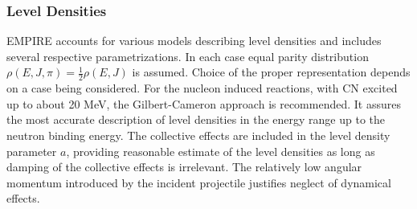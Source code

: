 \documentclass[twocolumn,amsmath,amssymb,10pt,groupedaddress,letter]{revtex4}
\begin{document}
%
%
%


\subsubsection{Level Densities}
EMPIRE accounts for various models describing level densities
and includes several respective parametrizations. In each case equal
parity distribution $\rho(E,J,\pi)=\frac{1}{2}\rho(E,J)$ is assumed.
Choice of the proper representation depends on a case being considered.
For the nucleon induced reactions, with CN excited up to about 20
MeV, the Gilbert-Cameron approach is recommended. It assures the most
accurate description of level densities in the energy range up to
the neutron binding energy. The collective effects are included in
the level density parameter $a$, providing reasonable estimate of
the level densities as long as damping of the collective effects is
irrelevant. The relatively low angular momentum introduced by the
incident projectile justifies neglect of dynamical effects.

\medskip
\end{document}
